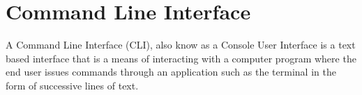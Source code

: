 \newpage
\chapter*{Command Line Interface}

A Command Line Interface (CLI), also know as a Console User Interface is a text based interface that is a means of interacting with a computer program where the end user issues commands through an application such as the terminal in the form of successive lines of text. 